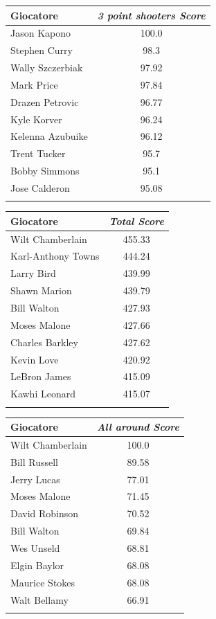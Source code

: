 \documentclass[10.5pt,a4paper,twocolumn]{article}
\begin{document}
\begin{table}[t]
	
	\parbox{.45\linewidth}{
		\begin{tabular}{lc}
			Giocatore & \textit{3 point shooters Score}  \\
			\hline
			Jason Kapono & 100.0\\
			Stephen Curry & 98.3\\
			Wally Szczerbiak & 97.92\\
			Mark Price & 97.84\\
			Drazen Petrovic & 96.77\\
			Kyle Korver & 96.24\\
			Kelenna Azubuike & 96.12\\
			Trent Tucker & 95.7\\
			Bobby Simmons & 95.1\\
			Jose Calderon & 95.08\\
			&\\
			
		\end{tabular}
	}
	\quad
	\hspace{19pt}
	\parbox{.45\linewidth}{
		\begin{tabular}{lc}
			Giocatore & \textit{Total Score}  \\
			\hline
			Wilt Chamberlain & 455.33\\
			Karl-Anthony Towns & 444.24\\
			Larry Bird & 439.99\\
			Shawn Marion & 439.79\\
			Bill Walton & 427.93\\
			Moses Malone & 427.66\\
			Charles Barkley & 427.62\\
			Kevin Love & 420.92\\
			LeBron James & 415.09\\
			Kawhi Leonard & 415.07\\
			&\\
			
	\end{tabular}}
	
	\parbox{.45\linewidth}{
		\begin{tabular}{lc}
			Giocatore & \textit{All around Score}  \\
			\hline
			Wilt Chamberlain & 100.0\\
			Bill Russell & 89.58\\
			Jerry Lucas & 77.01\\
			Moses Malone & 71.45\\
			David Robinson & 70.52\\
			Bill Walton & 69.84\\
			Wes Unseld & 68.81\\
			Elgin Baylor & 68.08\\
			Maurice Stokes & 68.08\\
			Walt Bellamy & 66.91\\
			&\\
			

\end{tabular}}
\end{table}
\end{document}
